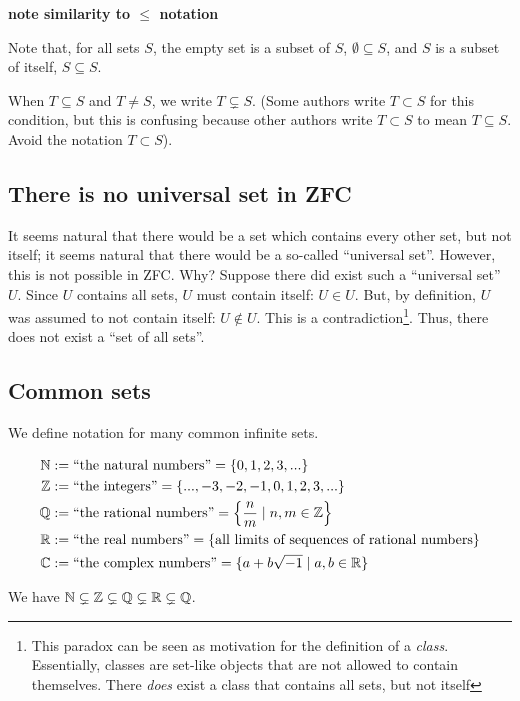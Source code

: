 \textbf{note similarity to $\leq$ notation}

Note that, for all sets $S$, the empty set is a subset of $S$, $\emptyset \subseteq S$, and $S$ is a subset of itself, $S \subseteq S$. 

When $T \subseteq S$ and $T \neq S$, we write $T \subsetneq S$. (Some authors write $T \subset S$ for this condition, but this is confusing because other authors write $T \subset S$ to mean $T \subseteq S$. Avoid the notation $T \subset S$).

\subsection*{There is no universal set in ZFC}

It seems natural that there would be a set which contains every other set, but not itself; it seems natural that there would be a so-called ``universal set''. However, this is not possible in ZFC. Why? Suppose there did exist such a ``universal set'' $U$. Since $U$ contains all sets, $U$ must contain itself: $U \in U$. But, by definition, $U$ was assumed to not contain itself: $U \notin U$. This is a contradiction\footnote{This paradox can be seen as motivation for the definition of a \textit{class}. Essentially, classes are set-like objects that are not allowed to contain themselves. There \textit{does} exist a class that contains all sets, but not itself}. Thus, there does not exist a ``set of all sets''.

\subsection*{Common sets}

We define notation for many common infinite sets.

\begin{align*}
    \mathbb{N} &:= \text{``the natural numbers''} = \{0, 1, 2, 3, ...\} \\
    \mathbb{Z} &:= \text{``the integers''} = \{..., -3, -2, -1, 0, 1, 2, 3, ... \} \\
    \mathbb{Q} &:= \text{``the rational numbers''} = \Big\{ \frac{n}{m} \mid n, m \in \mathbb{Z} \Big\} \\
    \mathbb{R} &:= \text{``the real numbers''} = \{ \text{all limits of sequences of rational numbers} \} \\
    \mathbb{C} &:= \text{``the complex numbers''} = \{ a + b \sqrt{-1} \mid a, b \in \mathbb{R} \}
\end{align*}

We have $\mathbb{N} \subsetneq \mathbb{Z} \subsetneq \mathbb{Q} \subsetneq \mathbb{R} \subsetneq \mathbb{Q}$.


